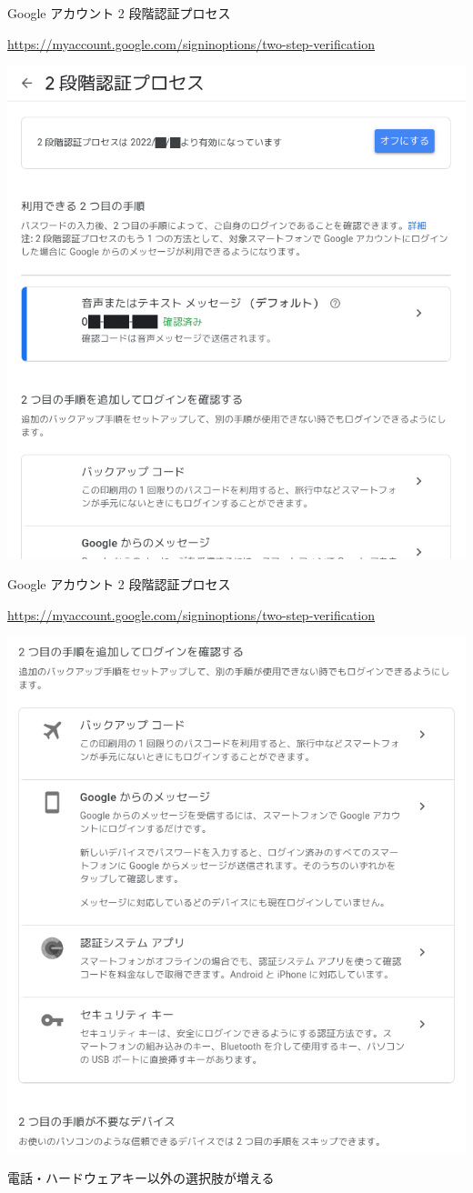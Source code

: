 \begin{frame}{Google アカウント 2 段階認証プロセス}

{\footnotesize\url{https://myaccount.google.com/signinoptions/two-step-verification}}

\begin{center}
\includegraphics[width=0.5\hsize]{image202205/g-signinopt-twostepverif-0-0.png}
\end{center}

\begin{quote}
\end{quote}

\end{frame}

\begin{frame}{Google アカウント 2 段階認証プロセス}

{\footnotesize\url{https://myaccount.google.com/signinoptions/two-step-verification}}

\begin{center}
\includegraphics[width=0.5\hsize]{image202205/g-signinopt-twostepverif-0-1.png}
\end{center}

電話・ハードウェアキー以外の選択肢が増える

\begin{quote}
\end{quote}

\end{frame}

